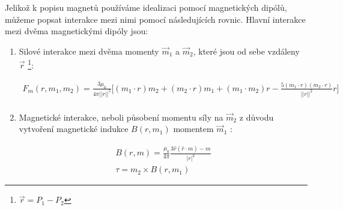 Jelikož k popisu magnetů používáme idealizaci pomocí magnetických dipólů, můžeme popsat interakce mezi nimi pomocí následujících rovnic.
Hlavní interakce mezi dvěma magnetickými dipóly jsou:
\begin{enumerate}[topsep=0pt, partopsep=0pt]
    \setlength{\itemsep}{0pt}%
    \setlength{\parskip}{0pt}%

    \item Silové interakce \cite{magnetic_force} mezi dvěma momenty $\vec{m}_1$ a $\vec{m}_2$, které jsou od sebe vzdáleny $\vec{r}$ \footnote{$\vec{r} = P_1 - P_2$}:

          \begin{equation}
              \label{eq:F_m}
              \begin{split}
                  F_m (r,m_1,m_2) = \frac{3\mu_0}{4\pi ||r||^5}
                  \bigg[
                      (m_1\cdot r) m_2 +
                      (m_2\cdot r) m_1 +
                      (m_1\cdot m_2) r -
                      \frac{5(m_1\cdot r)(m_2\cdot r)}{||r||^2} r
                  \bigg] \\
              \end{split}
          \end{equation}

    \item Magnetické interakce, neboli působení momentu síly \cite{magnetic_torque} na $\vec{m}_2$ z důvodu vytvoření magnetické indukce $B(r, m_1)$ momentem $\vec{m}_1$ \cite{magnetic_force}:

          \begin{equation}
              \label{eq:B}
              \begin{split}
                  B (r, m) = \frac{\mu_0}{4\pi}\frac{3 \hat{r}(\hat{r}\cdot m) - m}{|r|^3} \\
                  \tau = m_2 \times B(r, m_1)
              \end{split}
          \end{equation}
\end{enumerate}

